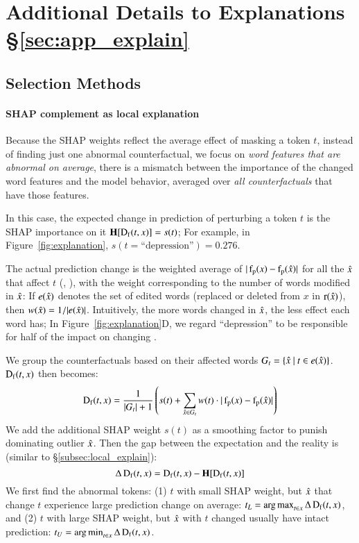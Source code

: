 \section{Additional Details to Explanations \S\ref{sec:app_explain}}
\label{appendix:explanation}


\subsection{Selection Methods}
\label{appendix:exp_rank}

\paragraph{SHAP complement as local explanation}
Because the SHAP weights reflect the average effect of masking a token $t$, instead of finding just one abnormal counterfactual, we focus on \emph{word features that are abnormal on average}, \ie there is a mismatch between the importance of the changed word features and the model behavior, averaged over \emph{all counterfactuals} that have those features.

In this case, the expected change in prediction of perturbing a token $t$ is the SHAP importance on it $\operatorname*{\mathbf{H}}[\operatorname*{D_f}(t, x)] = s(t)$; 
For example, in Figure~\ref{fig:explanation}, $s(t=\text{``depression''})=0.276$.

The actual prediction change is the weighted average of $|\operatorname*{f_p}(x)-\operatorname*{f_p}(\hat{x})|$ for all the $\hat{x}$ that affect $t$ (, ), with the weight corresponding to the number of words modified in $\hat{x}$: If $e(\hat{x})$ denotes the set of edited words (replaced or deleted from $x$ in $\operatorname*{r}(\hat{x})$), then $w(\hat{x}) = 1/|e(\hat{x})|$.
Intuitively, the more words changed in $\hat{x}$, the less effect each word has; In Figure~\ref{fig:explanation}D, we regard ``depression'' to be responsible for half of the impact on changing .

We group the counterfactuals based on their affected words $G_t = \{\hat{x}\ |\ t \in e(\hat{x})\}$. $\operatorname*{D_f}(t, x)$ then becomes:
$$\operatorname*{D_f}(t, x) = \frac{1}{|G_t|+1} \left(s(t) + \sum_{\hat{x} \in G_t} w(t)\cdot |\operatorname*{f_p}(x)-\operatorname*{f_p}(\hat{x})|\right)$$
We add the additional SHAP weight $s(t)$ as a smoothing factor to punish dominating outlier $\hat{x}$.
Then the gap between the expectation and the reality is (similar to \S\ref{subsec:local_explain}):
$$\Delta\operatorname*{D_f}(t, x) = \operatorname*{D_f}(t, x)-\operatorname*{\mathbf{H}}[\operatorname*{D_f}(t, x)]$$
We first find the abnormal tokens: (1) $t$ with small SHAP weight, but $\hat{x}$ that change $t$ experience large prediction change on average: $t_L = \operatorname*{arg\,max}_{t\in x} \Delta\operatorname*{D_f}(t, x)$, and (2) $t$ with large SHAP weight, but $\hat{x}$ with $t$ changed usually have intact prediction: $t_U = \operatorname*{arg\,min}_{t\in x} \Delta\operatorname*{D_f}(t, x)$.

